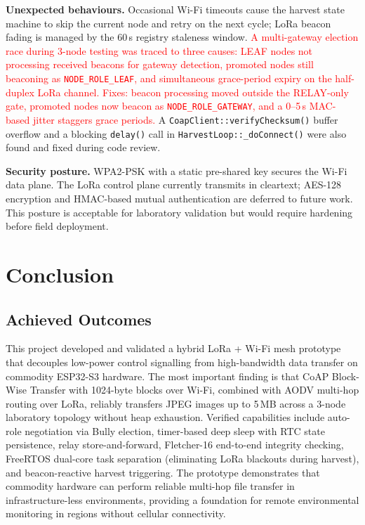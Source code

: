 \documentclass[12pt,a4paper]{article}
\newcommand{\changed}[1]{\textcolor{red}{#1}}
\begin{document}
\textbf{Unexpected behaviours.} Occasional Wi-Fi timeouts cause the harvest state machine to skip the current node and retry on the next cycle; LoRa beacon fading is managed by the 60\,s registry staleness window. \changed{A multi-gateway election race during 3-node testing was traced to three causes: LEAF nodes not processing received beacons for gateway detection, promoted nodes still beaconing as \texttt{NODE\_ROLE\_LEAF}, and simultaneous grace-period expiry on the half-duplex LoRa channel. Fixes: beacon processing moved outside the RELAY-only gate, promoted nodes now beacon as \texttt{NODE\_ROLE\_GATEWAY}, and a 0--5\,s MAC-based jitter staggers grace periods.} A \texttt{CoapClient::verifyChecksum()} buffer overflow and a blocking \texttt{delay()} call in \texttt{HarvestLoop::\_doConnect()} were also found and fixed during code review.

\textbf{Security posture.} WPA2-PSK with a static pre-shared key secures the Wi-Fi data plane. The LoRa control plane currently transmits in cleartext; AES-128 encryption and HMAC-based mutual authentication are deferred to future work. This posture is acceptable for laboratory validation but would require hardening before field deployment.

\newpage


\section{Conclusion}

\subsection{Achieved Outcomes}

This project developed and validated a hybrid LoRa + Wi-Fi mesh prototype that decouples low-power control signalling from high-bandwidth data transfer on commodity ESP32-S3 hardware. The most important finding is that CoAP Block-Wise Transfer with 1024-byte blocks over Wi-Fi, combined with AODV multi-hop routing over LoRa, reliably transfers JPEG images up to 5\,MB across a 3-node laboratory topology without heap exhaustion. Verified capabilities include auto-role negotiation via Bully election, timer-based deep sleep with RTC state persistence, relay store-and-forward, Fletcher-16 end-to-end integrity checking, FreeRTOS dual-core task separation (eliminating LoRa blackouts during harvest), and beacon-reactive harvest triggering. The prototype demonstrates that commodity hardware can perform reliable multi-hop file transfer in infrastructure-less environments, providing a foundation for remote environmental monitoring in regions without cellular connectivity.
\end{document}
